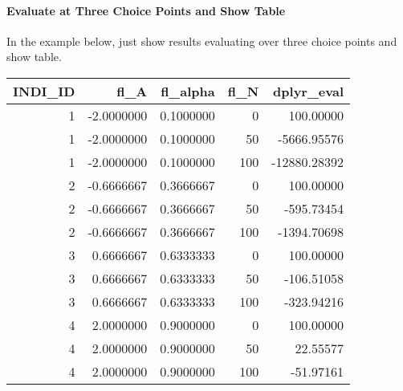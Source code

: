 \documentclass[
]{book}
\newenvironment{Shaded}{\begin{snugshade}}{\end{snugshade}}
\newcommand{\CommentTok}[1]{\textcolor[rgb]{0.56,0.35,0.01}{\textit{#1}}}
\newcommand{\DataTypeTok}[1]{\textcolor[rgb]{0.13,0.29,0.53}{#1}}
\newcommand{\KeywordTok}[1]{\textcolor[rgb]{0.13,0.29,0.53}{\textbf{#1}}}
\newcommand{\NormalTok}[1]{#1}
\newcommand{\OperatorTok}[1]{\textcolor[rgb]{0.81,0.36,0.00}{\textbf{#1}}}
\newcommand{\StringTok}[1]{\textcolor[rgb]{0.31,0.60,0.02}{#1}}
\begin{document}
\hypertarget{evaluate-at-three-choice-points-and-show-table}{%
\paragraph{Evaluate at Three Choice Points and Show Table}\label{evaluate-at-three-choice-points-and-show-table}}

In the example below, just show results evaluating over three choice points and show table.

\begin{Shaded}
\end{Shaded}

\begin{table}[!h]
\centering
\begin{tabular}{r|r|r|r|r}
\hline
INDI\_ID & fl\_A & fl\_alpha & fl\_N & dplyr\_eval\\
\hline
\rowcolor{gray!6}  1 & -2.0000000 & 0.1000000 & 0 & 100.00000\\
\hline
1 & -2.0000000 & 0.1000000 & 50 & -5666.95576\\
\hline
\rowcolor{gray!6}  1 & -2.0000000 & 0.1000000 & 100 & -12880.28392\\
\hline
2 & -0.6666667 & 0.3666667 & 0 & 100.00000\\
\hline
\rowcolor{gray!6}  2 & -0.6666667 & 0.3666667 & 50 & -595.73454\\
\hline
2 & -0.6666667 & 0.3666667 & 100 & -1394.70698\\
\hline
\rowcolor{gray!6}  3 & 0.6666667 & 0.6333333 & 0 & 100.00000\\
\hline
3 & 0.6666667 & 0.6333333 & 50 & -106.51058\\
\hline
\rowcolor{gray!6}  3 & 0.6666667 & 0.6333333 & 100 & -323.94216\\
\hline
4 & 2.0000000 & 0.9000000 & 0 & 100.00000\\
\hline
\rowcolor{gray!6}  4 & 2.0000000 & 0.9000000 & 50 & 22.55577\\
\hline
4 & 2.0000000 & 0.9000000 & 100 & -51.97161\\
\hline
\end{tabular}
\end{table}
\end{document}
